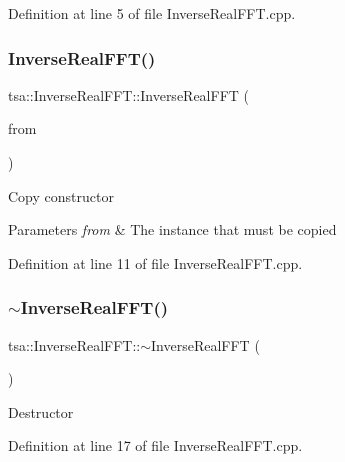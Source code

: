 Definition at line 5 of file Inverse\+Real\+F\+F\+T.\+cpp.

\mbox{\label{classtsa_1_1_inverse_real_f_f_t_a5a9e17eaf4fd69e719dca4b881010876}} 
\subsubsection{\texorpdfstring{Inverse\+Real\+F\+F\+T()}{InverseRealFFT()}\hspace{0.1cm}{\footnotesize\ttfamily [2/2]}}
{\footnotesize\ttfamily tsa\+::\+Inverse\+Real\+F\+F\+T\+::\+Inverse\+Real\+F\+FT (\begin{DoxyParamCaption}\item[{const \hyperlink{classtsa_1_1_inverse_real_f_f_t}{Inverse\+Real\+F\+FT} \&}]{from }\end{DoxyParamCaption})}

Copy constructor


\begin{DoxyParams}{Parameters}
{\em from} & The instance that must be copied \\
\hline
\end{DoxyParams}


Definition at line 11 of file Inverse\+Real\+F\+F\+T.\+cpp.

\mbox{\label{classtsa_1_1_inverse_real_f_f_t_a928e08fb19e46a901e0dc42ec5970801}} 
\subsubsection{\texorpdfstring{$\sim$\+Inverse\+Real\+F\+F\+T()}{~InverseRealFFT()}}
{\footnotesize\ttfamily tsa\+::\+Inverse\+Real\+F\+F\+T\+::$\sim$\+Inverse\+Real\+F\+FT (\begin{DoxyParamCaption}{ }\end{DoxyParamCaption})}

Destructor 

Definition at line 17 of file Inverse\+Real\+F\+F\+T.\+cpp.



